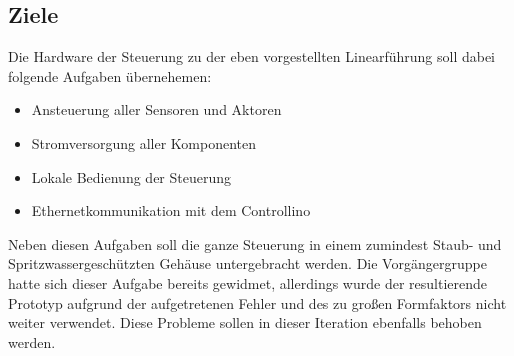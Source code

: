 \subsection{Ziele}
Die Hardware der Steuerung zu der eben vorgestellten Linearführung soll dabei folgende Aufgaben übernehemen:
\begin{itemize}
	\item Ansteuerung aller Sensoren und Aktoren
	\item Stromversorgung aller Komponenten
	\item Lokale Bedienung der Steuerung
	\item Ethernetkommunikation mit dem Controllino
\end{itemize}

\noindent Neben diesen Aufgaben soll die ganze Steuerung in einem zumindest Staub- und Spritzwassergeschützten Gehäuse untergebracht werden. Die Vorgängergruppe hatte sich dieser Aufgabe bereits gewidmet, allerdings wurde der resultierende Prototyp aufgrund der aufgetretenen Fehler und des zu großen Formfaktors nicht weiter verwendet. Diese Probleme sollen in dieser Iteration ebenfalls behoben werden.

%

